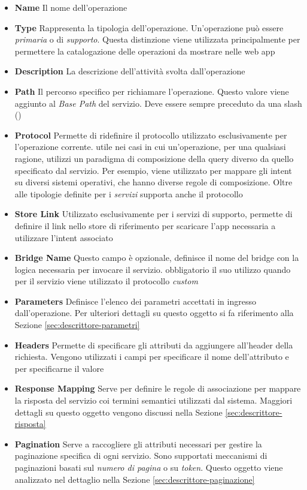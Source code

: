 \begin{itemize}
	\item \textbf{Name}
	Il nome dell'operazione
	\item \textbf{Type}
	Rappresenta la tipologia dell'operazione. Un'operazione può essere \emph{primaria} o di \emph{supporto}. Questa distinzione viene utilizzata principalmente per permettere la catalogazione delle operazioni da mostrare nelle web app
	\item \textbf{Description}
	La descrizione dell'attività svolta dall'operazione
	\item \textbf{Path}
	Il percorso specifico per richiamare l'operazione. Questo valore viene aggiunto al \emph{Base Path} del servizio. Deve essere sempre preceduto da una slash (\virgolette{/})
	\item \textbf{Protocol}
	Permette di ridefinire il protocollo utilizzato esclusivamente per l'operazione corrente. \upe utile nei casi in cui un'operazione, per una qualsiasi ragione, utilizzi un paradigma di composizione della query diverso da quello specificato dal servizio. Per esempio, viene utilizzato per mappare gli intent su diversi sistemi operativi, che hanno diverse regole di composizione. Oltre alle tipologie definite per i \emph{servizi} supporta anche il protocollo 
	\item \textbf{Store Link}
	Utilizzato esclusivamente per i servizi di supporto, permette di definire il link nello store di riferimento per scaricare l'app necessaria a utilizzare l'intent associato
	\item \textbf{Bridge Name}
	Questo campo è opzionale, definisce il nome del bridge con la logica necessaria per invocare il servizio. \upe obbligatorio il suo utilizzo quando per il servizio viene utilizzato il protocollo \emph{custom}
	\item \textbf{Parameters}
	Definisce l'elenco dei parametri accettati in ingresso dall'operazione. Per ulteriori dettagli su questo oggetto si fa riferimento alla Sezione \ref{sec:descrittore-parametri}
	\item \textbf{Headers}
	Permette di specificare gli attributi da aggiungere all'header della richiesta. Vengono utilizzati i campi  per specificare il nome dell'attributo e  per specificarne il valore
	\item \textbf{Response Mapping}
	Serve per definire le regole di associazione per mappare la risposta del servizio coi termini semantici utilizzati dal sistema. Maggiori dettagli su questo oggetto vengono discussi nella Sezione \ref{sec:descrittore-risposta}
	\item \textbf{Pagination}
	Serve a raccogliere gli attributi necessari per gestire la paginazione specifica di ogni servizio. Sono supportati meccanismi di paginazioni basati sul \emph{numero di pagina} o su \emph{token}. Questo oggetto viene analizzato nel dettaglio nella Sezione \ref{sec:descrittore-paginazione}
\end{itemize}

